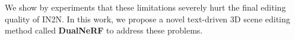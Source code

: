 
We show by experiments that these limitations severely hurt the final editing quality of IN2N. In this work, we propose a novel text-driven 3D scene editing method called \textbf{DualNeRF} to address these problems.



